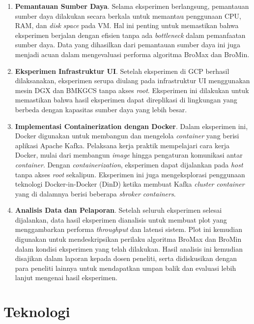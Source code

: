 \begin{enumerate}
	\item \textbf{Pemantauan Sumber Daya}. Selama eksperimen berlangsung, pemantauan sumber daya dilakukan secara berkala untuk memantau penggunaan CPU, RAM, dan \textit{disk space} pada VM. Hal ini penting untuk memastikan bahwa eksperimen berjalan dengan efisien tanpa ada \textit{bottleneck} dalam pemanfaatan sumber daya. Data yang dihasilkan dari pemantauan sumber daya ini juga menjadi acuan dalam mengevaluasi performa algoritma BroMax dan BroMin.

	\item \textbf{Eksperimen Infrastruktur UI}. Setelah eksperimen di GCP berhasil dilaksanakan, eksperimen serupa diulang pada infrastruktur UI menggunakan mesin DGX dan BMKGCS tanpa akses \textit{root}. Eksperimen ini dilakukan untuk memastikan bahwa hasil eksperimen dapat direplikasi di lingkungan yang berbeda dengan kapasitas sumber daya yang lebih besar.

	\item \textbf{Implementasi Containerization dengan Docker}. Dalam eksperimen ini, Docker digunakan untuk membangun dan mengelola \textit{container} yang berisi aplikasi Apache Kafka. Pelaksana kerja praktik mempelajari cara kerja Docker, mulai dari membangun \textit{image} hingga pengaturan komunikasi antar \textit{container}. Dengan \textit{containerization}, eksperimen dapat dijalankan pada \textit{host} tanpa akses \textit{root} sekalipun. Eksperimen ini juga mengeksplorasi penggunaan teknologi Docker-in-Docker (DinD) ketika membuat Kafka \textit{cluster container} yang di dalamnya berisi beberapa \textit{sbroker containers}.

	\item \textbf{Analisis Data dan Pelaporan}. Setelah seluruh eksperimen selesai dijalankan, data hasil eksperimen dianalisis untuk membuat plot yang menggambarkan performa \textit{throughput} dan latensi sistem. Plot ini kemudian digunakan untuk mendeskripsikan perilaku algoritma BroMax dan BroMin dalam kondisi eksperimen yang telah dilakukan. Hasil analisis ini kemudian disajikan dalam laporan kepada dosen peneliti, serta didiskusikan dengan para peneliti lainnya untuk mendapatkan umpan balik dan evaluasi lebih lanjut mengenai hasil eksperimen.

\end{enumerate}

\section{Teknologi}

